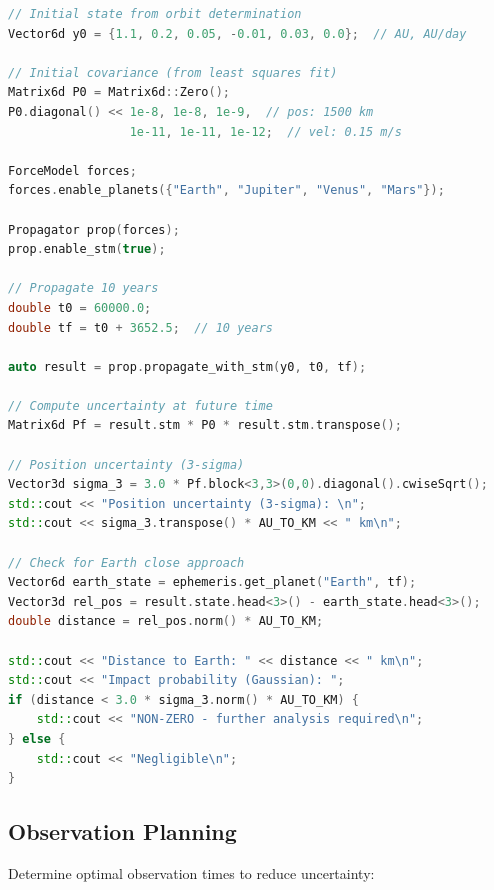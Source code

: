 \begin{lstlisting}[language=C++,caption={Asteroid uncertainty propagation}]
// Initial state from orbit determination
Vector6d y0 = {1.1, 0.2, 0.05, -0.01, 0.03, 0.0};  // AU, AU/day

// Initial covariance (from least squares fit)
Matrix6d P0 = Matrix6d::Zero();
P0.diagonal() << 1e-8, 1e-8, 1e-9,  // pos: 1500 km
                 1e-11, 1e-11, 1e-12;  // vel: 0.15 m/s

ForceModel forces;
forces.enable_planets({"Earth", "Jupiter", "Venus", "Mars"});

Propagator prop(forces);
prop.enable_stm(true);

// Propagate 10 years
double t0 = 60000.0;
double tf = t0 + 3652.5;  // 10 years

auto result = prop.propagate_with_stm(y0, t0, tf);

// Compute uncertainty at future time
Matrix6d Pf = result.stm * P0 * result.stm.transpose();

// Position uncertainty (3-sigma)
Vector3d sigma_3 = 3.0 * Pf.block<3,3>(0,0).diagonal().cwiseSqrt();
std::cout << "Position uncertainty (3-sigma): \n";
std::cout << sigma_3.transpose() * AU_TO_KM << " km\n";

// Check for Earth close approach
Vector6d earth_state = ephemeris.get_planet("Earth", tf);
Vector3d rel_pos = result.state.head<3>() - earth_state.head<3>();
double distance = rel_pos.norm() * AU_TO_KM;

std::cout << "Distance to Earth: " << distance << " km\n";
std::cout << "Impact probability (Gaussian): ";
if (distance < 3.0 * sigma_3.norm() * AU_TO_KM) {
    std::cout << "NON-ZERO - further analysis required\n";
} else {
    std::cout << "Negligible\n";
}
\end{lstlisting}

\subsection{Observation Planning}

Determine optimal observation times to reduce uncertainty:


